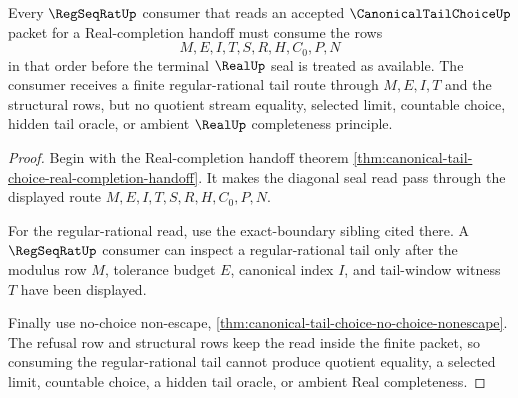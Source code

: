\begin{theorem}
\label{thm:canonical-tail-choice-regseqrat-consumption}
Every $\RegSeqRatUp$ consumer that reads an accepted $\CanonicalTailChoiceUp$ packet for a Real-completion handoff must consume the rows
$$
M,E,I,T,S,R,H,C_0,P,N
$$
in that order before the terminal $\RealUp$ seal is treated as available. The consumer receives a finite regular-rational tail route through $M,E,I,T$ and the structural rows, but no quotient stream equality, selected limit, countable choice, hidden tail oracle, or ambient $\RealUp$ completeness principle.
\end{theorem}
\begin{proof}
Begin with the Real-completion handoff theorem \autoref{thm:canonical-tail-choice-real-completion-handoff}. It makes the diagonal seal read pass through the displayed route $M,E,I,T,S,R,H,C_0,P,N$.

For the regular-rational read, use the exact-boundary sibling cited there. A $\RegSeqRatUp$ consumer can inspect a regular-rational tail only after the modulus row $M$, tolerance budget $E$, canonical index $I$, and tail-window witness $T$ have been displayed.

Finally use no-choice non-escape, \autoref{thm:canonical-tail-choice-no-choice-nonescape}. The refusal row and structural rows keep the read inside the finite packet, so consuming the regular-rational tail cannot produce quotient equality, a selected limit, countable choice, a hidden tail oracle, or ambient Real completeness.
\end{proof}

